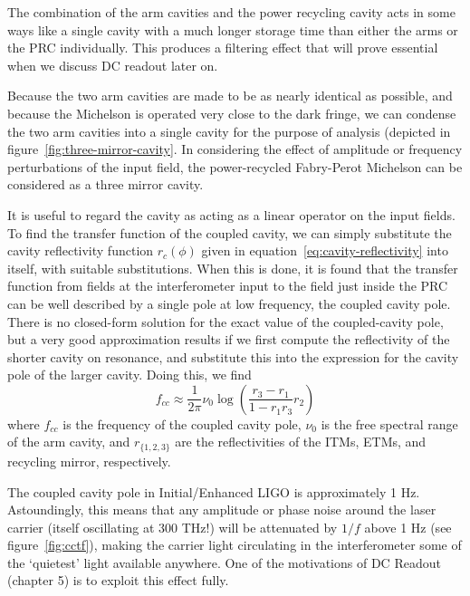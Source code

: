 The combination of the arm cavities and the power recycling cavity acts
in some ways like a single cavity with a much longer storage time than
either the arms or the PRC individually.  This produces a filtering 
effect that will prove essential when we discuss DC readout later on.

Because the two arm cavities are made to be as nearly identical as
possible, and because the Michelson is operated very close to the dark
fringe, we can condense the two arm cavities into a single cavity for
the purpose of analysis (depicted in figure~\ref{fig:three-mirror-cavity}.  
In considering the effect of amplitude or frequency perturbations of the 
input field, the power-recycled Fabry-Perot Michelson can be considered 
as a three mirror cavity.

It is useful to regard the cavity as acting as a linear operator on
the input fields.  To find the transfer function of the coupled
cavity, we can simply substitute the cavity reflectivity function
$r_c(\phi)$ given in equation~\ref{eq:cavity-reflectivity} into
itself, with suitable substitutions.
%
When this is done, it is found that the transfer function from fields at
the interferometer input to the field just inside the PRC can be well
described by a single pole at low frequency, the coupled cavity pole.
%
There is no closed-form solution for the exact value of the coupled-cavity
pole\cite{Rakhmanov2000Dynamics}, but a very good approximation 
results if we first compute the reflectivity of the shorter cavity on
resonance, and substitute this into the expression for the cavity pole
of the larger cavity. Doing this, we find
%
\begin{equation}
f_{cc} \approx \frac{1}{2\pi} \nu_0  \log \left(\frac{r_3 - r_1}{1 - r_1 r_3} r_2\right)
\end{equation}
where $f_{cc}$ is the frequency of the coupled cavity pole, $\nu_0$ is
the free spectral range of the arm cavity, and $r_{\{1,2,3\}}$ are the
reflectivities of the ITMs, ETMs, and recycling mirror, respectively.

The coupled cavity pole in Initial/Enhanced LIGO is approximately 1
Hz.  Astoundingly, this means that any amplitude or phase noise around
the laser carrier (itself oscillating at 300 THz!) will be attenuated
by $1/f$ above 1 Hz (see figure~\ref{fig:cctf}), making the carrier
light circulating in the interferometer some of the `quietest' light
available anywhere.  One of the motivations of DC Readout (chapter 5)
is to exploit this effect fully.  

